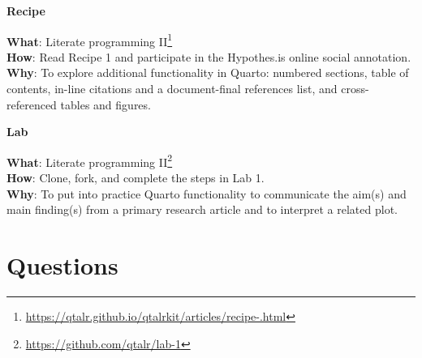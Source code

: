 \documentclass[
  letterpaper,
  DIV=11,
  numbers=noendperiod]{scrreport}
\theoremstyle{definition}
\theoremstyle{remark}
\DeclareRobustCommand{\href}[2]{#2\footnote{\url{#1}}}
\begin{document}
\begin{tcolorbox}[enhanced jigsaw, breakable, rightrule=.15mm, arc=.35mm, left=2mm, opacityback=0, leftrule=.75mm, toprule=.15mm, bottomrule=.15mm, colback=white]

\textbf{ Recipe}

\textbf{What}:
\href{https://qtalr.github.io/qtalrkit/articles/recipe-.html}{Literate
programming II}\\
\textbf{How}: Read Recipe 1 and participate in the Hypothes.is online
social annotation.\\
\textbf{Why}: To explore additional functionality in Quarto: numbered
sections, table of contents, in-line citations and a document-final
references list, and cross-referenced tables and figures.

\end{tcolorbox}

\begin{tcolorbox}[enhanced jigsaw, breakable, rightrule=.15mm, arc=.35mm, left=2mm, opacityback=0, leftrule=.75mm, toprule=.15mm, bottomrule=.15mm, colback=white]

\textbf{ Lab}

\textbf{What}: \href{https://github.com/qtalr/lab-1}{Literate
programming II}\\
\textbf{How}: Clone, fork, and complete the steps in Lab 1.\\
\textbf{Why}: To put into practice Quarto functionality to communicate
the aim(s) and main finding(s) from a primary research article and to
interpret a related plot.

\end{tcolorbox}

\hypertarget{questions}{%
\section*{Questions}\label{questions}}

\end{document}
